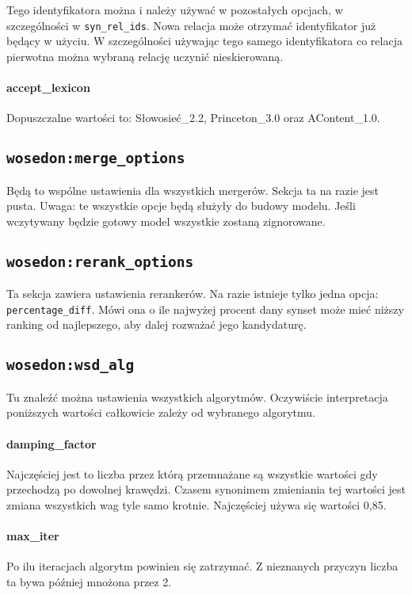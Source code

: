 \documentclass[10pt,a4paper]{article}
\begin{document}
Tego identyfikatora można i należy używać w pozostałych opcjach, w szczególności w \texttt{syn\_rel\_ids}. Nowa relacja może otrzymać identyfikator już będący w użyciu. W szczególności używając tego samego identyfikatora co relacja pierwotna można wybraną relację uczynić nieskierowaną.


\paragraph{accept\_lexicon} %
Dopuszczalne wartości to: Słowosieć\_2.2, Princeton\_3.0 oraz AContent\_1.0.



\subsection{\texttt{wosedon:merge\_options}}
Będą to wspólne ustawienia dla wszystkich mergerów. Sekcja ta na razie jest pusta. Uwaga: te wszystkie opcje będą służyły do budowy modelu. Jeśli wczytywany będzie gotowy model wszystkie zostaną zignorowane.



\subsection{\texttt{wosedon:rerank\_options}}
\label{sec:rerank_opt}
Ta sekcja zawiera ustawienia rerankerów. Na razie istnieje tylko jedna opcja: \texttt{percentage\_diff}. Mówi ona o ile najwyżej procent dany synset może mieć niższy ranking od najlepszego, aby dalej rozważać jego kandydaturę.

\subsection{\texttt{wosedon:wsd\_alg}}
\label{subsec:alg_opt}
Tu znaleźć można ustawienia wszystkich algorytmów. Oczywiście interpretacja poniższych wartości całkowicie zależy od wybranego algorytmu.

\paragraph{damping\_factor}
Najczęściej jest to liczba przez którą przemnażane są wszystkie wartości gdy przechodzą po dowolnej krawędzi. Czasem synonimem zmieniania tej wartości jest zmiana wszystkich wag tyle samo krotnie. Najczęściej używa się wartości 0,85.

\paragraph{max\_iter} %
Po ilu iteracjach algorytm powinien się zatrzymać. Z nieznanych przyczyn liczba ta bywa później mnożona przez 2.
\end{document}
